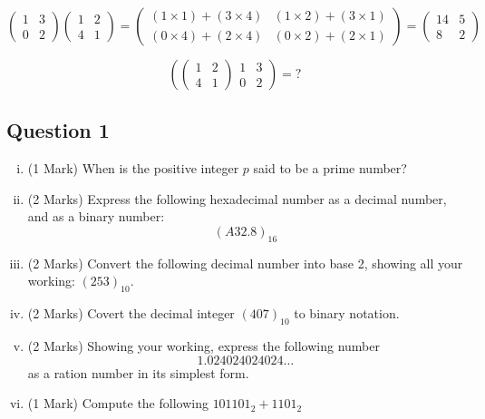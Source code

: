 \documentclass[]{report}
\begin{document}
{{{{{{\bigskip
\large{
\[ \left(
\begin{array}{cc}
1 & 3 \\ 
0 & 2
\end{array} \right)\left(
\begin{array}{cc}
1 & 2 \\ 
4 & 1
\end{array} \right) = \left(
\begin{array}{cc}
(1 \times 1) + (3 \times 4) & (1 \times 2) + (3 \times 1) \\ 
(0 \times 4) + (2 \times 4) & (0 \times 2) + (2 \times 1)
\end{array} \right) = \left(
\begin{array}{cc}
14 & 5 \\ 
8 & 2
\end{array} \right) \]
}

\[ \left(
\left(
\begin{array}{cc}
1 & 2 \\ 
4 & 1
\end{array} \right)
\begin{array}{cc}
1 & 3 \\ 
0 & 2
\end{array} \right) = ? \]


\subsection*{Question 1}

\begin{enumerate}[(i)]
\item (1 Mark) When is the positive integer $p$ said to be a prime number?
\item (2 Marks) Express the following hexadecimal number as a decimal number, and as a binary number: \[(A32.8)_{16}\]

\item (2 Marks) Convert the following decimal number into base 2, showing all your working: $(253)_{10}$. 
\item (2 Marks) Covert the decimal integer $(407)_{10}$ to binary notation.

\item (2 Marks) Showing your working, express the following number 
\[ 1.024024024024\ldots\]
as a ration number in its simplest form.
\item (1 Mark) Compute the following $101101_2 + 1101_2$ 
\end{enumerate}
}}}}}}
\end{document}
